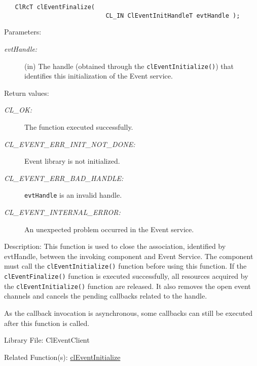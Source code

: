 \begin{flushleft}
\begin{Desc}
\footnotesize\begin{verbatim}   ClRcT clEventFinalize(
              				CL_IN ClEventInitHandleT evtHandle );
\end{verbatim}
\normalsize
\end{Desc}
\begin{Desc}
\item[Parameters:]
\begin{description}
\item[{\em evt\-Handle:}](in) The handle (obtained through the {\tt{clEventInitialize()}}) that identifies this initialization of the Event service.
\end{description}
\end{Desc}
\begin{Desc}
\item[Return values:]
\begin{description}
\item[{\em CL\_\-OK:}]The function executed successfully. 
\item[{\em CL\_\-EVENT\_\-ERR\_\-INIT\_\-NOT\_\-DONE:}]Event library is not initialized. 
\item[{\em CL\_\-EVENT\_\-ERR\_\-BAD\_\-HANDLE:}]{\tt{evtHandle}} is an invalid handle. 
\item[{\em CL\_\-EVENT\_\-INTERNAL\_\-ERROR:}]An unexpected problem occurred in the Event service.\end{description}
\end{Desc}
\begin{Desc}
\item[Description:]
This function is used to close the association, identified by evtHandle, between the invoking component and Event Service. The component must call the
{\tt{clEventInitialize()}} function before using this function. If the {\tt{clEventFinalize()}} function is executed successfully, all resources acquired
by the {\tt{clEventInitialize()}} function are released. It also removes the open event channels and cancels the pending callbacks related to the handle. 
\par
As the callback invocation is asynchronous, some callbacks can still be executed after this function is called. 
\end{Desc}
\begin{Desc}
\item[Library File:]Cl\-Event\-Client\end{Desc}
\begin{Desc}
\item[Related Function(s):]\hyperlink{pageem101}{cl\-Event\-Initialize} \end{Desc}
\newpage



\end{flushleft}
